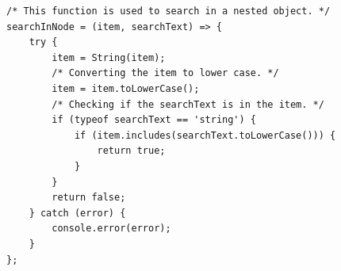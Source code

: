 \begin{lstlisting}[caption={search Function (Frontend)}, style=js]
/* This function is used to search in a nested object. */
searchInNode = (item, searchText) => {
	try {
		item = String(item);
		/* Converting the item to lower case. */
		item = item.toLowerCase();
		/* Checking if the searchText is in the item. */
		if (typeof searchText == 'string') {
			if (item.includes(searchText.toLowerCase())) {
				return true;
			}
		}
		return false;
	} catch (error) {
		console.error(error);
	}
};
\end{lstlisting}


\clearpage
